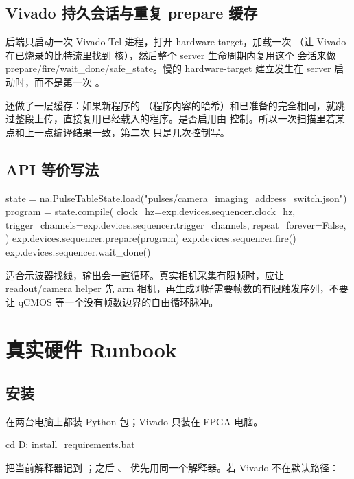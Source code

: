 \documentclass[11pt,oneside,openany]{book}
\begin{document}
\section{Vivado 持久会话与重复 prepare 缓存}
 后端只启动一次 Vivado Tcl 进程，打开 hardware target，加载一次 （让 Vivado 在已烧录的比特流里找到  核），然后整个 server 生命周期内复用这个  会话来做 prepare/fire/wait\_done/safe\_state。慢的 hardware-target 建立发生在 server 启动时，而不是第一次 。

 还做了一层缓存：如果新程序的 （程序内容的哈希）和已准备的完全相同，就跳过整段上传，直接复用已经载入的程序。是否启用由  控制。所以一次扫描里若某点和上一点编译结果一致，第二次  只是几次控制写。

\section{API 等价写法}
\begin{codeblock}[Python]
state = na.PulseTableState.load("pulses/camera_imaging_address_switch.json")
program = state.compile(
    clock_hz=exp.devices.sequencer.clock_hz,
    trigger_channels=exp.devices.sequencer.trigger_channels,
    repeat_forever=False,
)
exp.devices.sequencer.prepare(program)
exp.devices.sequencer.fire()
exp.devices.sequencer.wait_done()
\end{codeblock}

 适合示波器找线，输出会一直循环。真实相机采集有限帧时，应让 readout/camera helper 先 arm 相机，再生成刚好需要帧数的有限触发序列，不要让 qCMOS 等一个没有帧数边界的自由循环脉冲。

\chapter{真实硬件 Runbook}

\section{安装}
在两台电脑上都装 Python 包；Vivado 只装在 FPGA 电脑。

\begin{codeblock}[PowerShell]
cd D:\ZLC
install_requirements.bat
\end{codeblock}

 把当前解释器记到 ；之后 、 优先用同一个解释器。若 Vivado 不在默认路径：
\end{document}
